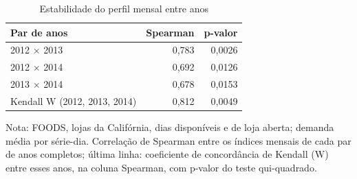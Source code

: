 \begin{table}[htbp]
\centering
\small
\caption{Estabilidade do perfil mensal entre anos}
\label{tab:saz_estabilidade}
\begin{tabular}{lrr}
\toprule
Par de anos & Spearman & p-valor \\
\midrule
2012 × 2013 & 0,783 & 0,0026 \\
2012 × 2014 & 0,692 & 0,0126 \\
2013 × 2014 & 0,678 & 0,0153 \\
Kendall W (2012, 2013, 2014) & 0,812 & 0,0049 \\
\bottomrule
\end{tabular}
\par\smallskip
{\footnotesize Nota: FOODS, lojas da Califórnia, dias disponíveis e de loja aberta; demanda média por série-dia. Correlação de Spearman entre os índices mensais de cada par de anos completos; última linha: coeficiente de concordância de Kendall (W) entre esses anos, na coluna Spearman, com p-valor do teste qui-quadrado.}
\end{table}
